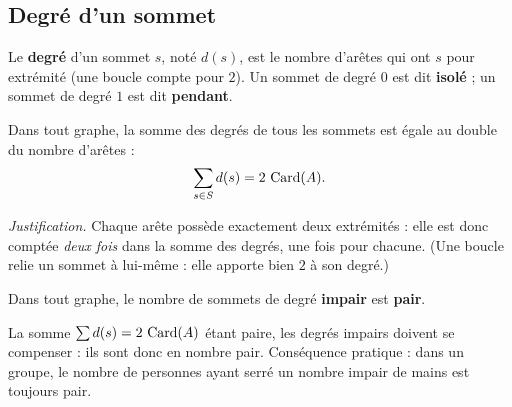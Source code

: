 \begin{illus}
\end{illus}

\subsection{Degré d'un sommet}

\begin{definition}[Degré]
Le \textbf{degré} d'un sommet $s$, noté $d(s)$, est le nombre d'arêtes qui ont $s$ pour
extrémité (une boucle compte pour $2$). Un sommet de degré $0$ est dit \textbf{isolé} ;
un sommet de degré $1$ est dit \textbf{pendant}.
\end{definition}

\begin{theoreme}
Dans tout graphe, la somme des degrés de tous les sommets est égale au double du nombre
d'arêtes :
\[
\sum_{s\in S} d(s) = 2\,\operatorname{Card}(A).
\]
\end{theoreme}

\noindent\emph{Justification.} Chaque arête possède exactement deux extrémités : elle est donc
comptée \emph{deux fois} dans la somme des degrés, une fois pour chacune. (Une boucle relie un
sommet à lui-même : elle apporte bien $2$ à son degré.)

\begin{propriete}
Dans tout graphe, le nombre de sommets de degré \textbf{impair} est \textbf{pair}.
\end{propriete}

\begin{remarque}
La somme $\sum d(s)=2\,\operatorname{Card}(A)$ étant paire, les degrés impairs doivent se compenser :
ils sont donc en nombre pair. Conséquence pratique : dans un groupe, le nombre de personnes
ayant serré un nombre impair de mains est toujours pair.
\end{remarque}

